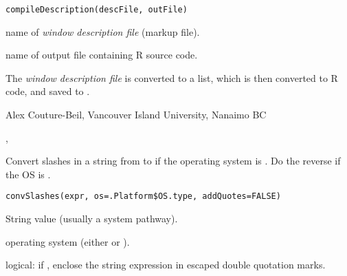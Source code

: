 \documentclass[letterpaper]{book}
\begin{document}
%
\begin{Usage}
\begin{verbatim}
compileDescription(descFile, outFile)
\end{verbatim}
\end{Usage}
%
\begin{Arguments}
\begin{ldescription}
\item[\code{descFile}] name of \emph{window description file} (markup file).
\item[\code{outFile}] name of output file containing R source code.
\end{ldescription}
\end{Arguments}
%
\begin{Details}\relax
The \emph{window description file}  is converted to a list, 
which is then converted to R code, and saved to .
\end{Details}
%
\begin{Author}\relax
Alex Couture-Beil, Vancouver Island University, Nanaimo BC
\end{Author}
%
\begin{SeeAlso}\relax
{}, 
\end{SeeAlso}
%
\begin{Description}\relax
Convert slashes in a string from \samp{/} to \samp{\bsl{}\bsl{}} if the 
operating system is . Do the reverse if the OS is
.
\end{Description}
%
\begin{Usage}
\begin{verbatim}
convSlashes(expr, os=.Platform$OS.type, addQuotes=FALSE)
\end{verbatim}
\end{Usage}
%
\begin{Arguments}
\begin{ldescription}
\item[\code{expr}]  String value (usually a system pathway). 
\item[\code{os}]  operating system (either  or ). 
\item[\code{addQuotes}]  logical: if , enclose the string expression
in escaped double quotation marks. 
\end{ldescription}
\end{Arguments}
\end{document}
